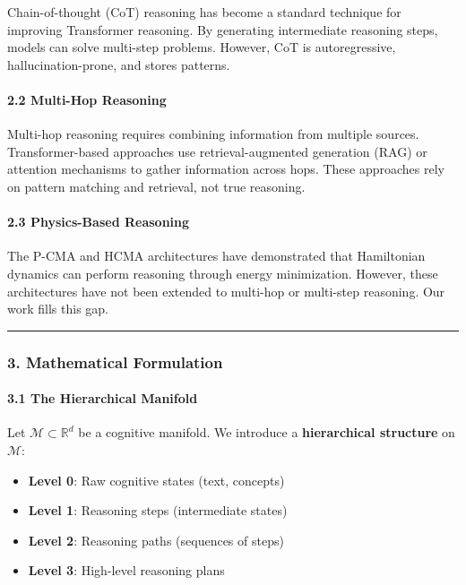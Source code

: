 \documentclass[
  11pt,
  a4paper,
]{article}
\providecommand{\tightlist}{%
  \setlength{\itemsep}{0pt}\setlength{\parskip}{0pt}}
\begin{document}
Chain-of-thought (CoT) reasoning has become a standard technique for
improving Transformer reasoning. By generating intermediate reasoning
steps, models can solve multi-step problems. However, CoT is
autoregressive, hallucination-prone, and stores patterns.

\paragraph{2.2 Multi-Hop Reasoning}\label{multi-hop-reasoning}

Multi-hop reasoning requires combining information from multiple
sources. Transformer-based approaches use retrieval-augmented generation
(RAG) or attention mechanisms to gather information across hops. These
approaches rely on pattern matching and retrieval, not true reasoning.

\paragraph{2.3 Physics-Based Reasoning}\label{physics-based-reasoning}

The P-CMA and HCMA architectures have demonstrated that Hamiltonian
dynamics can perform reasoning through energy minimization. However,
these architectures have not been extended to multi-hop or multi-step
reasoning. Our work fills this gap.

\begin{center}\rule{0.5\linewidth}{0.5pt}\end{center}

\subsubsection{3. Mathematical
Formulation}\label{mathematical-formulation-2}

\paragraph{3.1 The Hierarchical
Manifold}\label{the-hierarchical-manifold}

Let \(\mathcal{M} \subset \mathbb{R}^d\) be a cognitive manifold. We
introduce a \textbf{hierarchical structure} on \(\mathcal{M}\):

\begin{itemize}
\tightlist
\item
  \textbf{Level 0}: Raw cognitive states (text, concepts)
\item
  \textbf{Level 1}: Reasoning steps (intermediate states)
\item
  \textbf{Level 2}: Reasoning paths (sequences of steps)
\item
  \textbf{Level 3}: High-level reasoning plans
\end{itemize}
\end{document}
